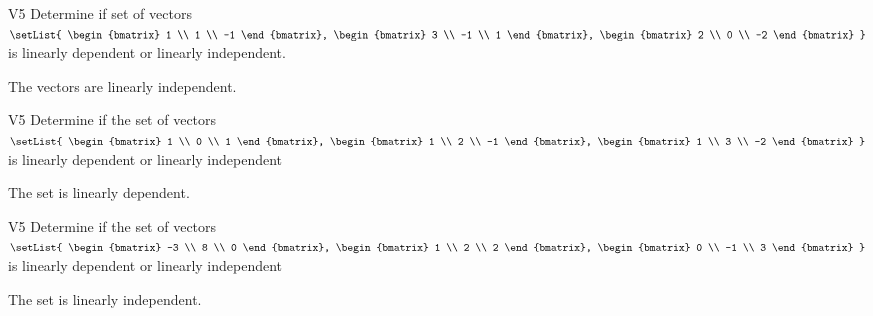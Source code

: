 \begin{problem}{V5}
Determine if set of vectors 
\(\setList{
  \begin{bmatrix} 1 \\ 1 \\ -1 \end{bmatrix},
  \begin{bmatrix} 3 \\ -1 \\ 1 \end{bmatrix},
  \begin{bmatrix} 2 \\ 0 \\ -2 \end{bmatrix}
}\)
is linearly dependent or linearly independent.
\end{problem}
\begin{solution}
The vectors are linearly independent.
\end{solution}


\begin{problem}{V5}
Determine if the set of vectors
\(
  \setList{
    \begin{bmatrix} 1 \\ 0 \\ 1 \end{bmatrix},
    \begin{bmatrix} 1 \\ 2 \\ -1 \end{bmatrix},
    \begin{bmatrix} 1 \\ 3 \\ -2 \end{bmatrix}
  }
\)
is linearly dependent or linearly independent
\end{problem}
\begin{solution}
The set is linearly dependent.
\end{solution}


\begin{problem}{V5}
Determine if the set of vectors \(\setList{ \begin{bmatrix} -3 \\ 8 \\ 0 \end{bmatrix}, \begin{bmatrix} 1 \\ 2 \\ 2 \end{bmatrix}, \begin{bmatrix} 0 \\ -1 \\ 3 \end{bmatrix} }\) is  linearly dependent or linearly independent
\end{problem}
\begin{solution}
The set is linearly independent.
\end{solution}

